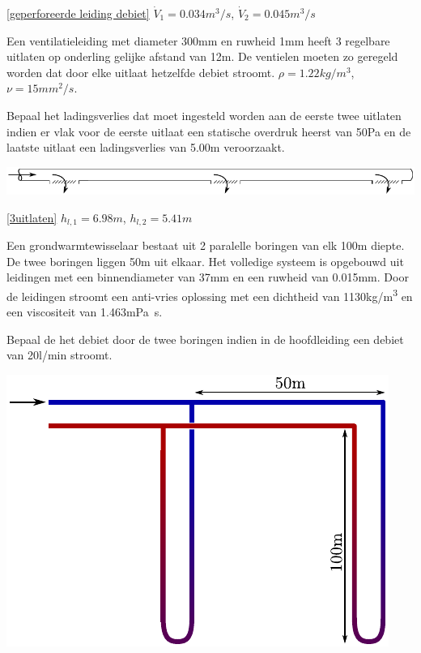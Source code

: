 \begin{antwoord}{\ref{geperforeerde leiding debiet}}
	$\dot{V}_1 = 0.034\unit{m^3/s}$, $\dot{V}_2 = 0.045\unit{m^3/s}$
\end{antwoord}
\begin{toepassing}
	\label{3uitlaten}
Een ventilatieleiding met diameter 300mm en ruwheid 1mm heeft 3 regelbare uitlaten op onderling gelijke afstand van 12m. De ventielen moeten zo geregeld worden dat door elke uitlaat hetzelfde debiet stroomt. $\rho = 1.22\unit{kg/m^3}$, $\nu = 15\unit{mm^2/s}$.
	
Bepaal het ladingsverlies dat moet ingesteld worden aan de eerste twee uitlaten indien er vlak voor de eerste uitlaat een statische overdruk heerst van 50Pa en de laatste uitlaat een ladingsverlies van 5.00m veroorzaakt.

	\centering
	\includegraphics{fig/leidingnetwerken/3uitlaten}
\end{toepassing}
\begin{antwoord}{\ref{3uitlaten}}
	$h_{l,1} = 6.98\unit{m}$, $h_{l,2} = 5.41\unit{m}$
\end{antwoord}
\begin{toepassing}[*]
	\label{grondwarmtewisselaar}
Een grondwarmtewisselaar bestaat uit 2 paralelle boringen van elk 100m diepte. De twee boringen liggen 50m uit elkaar. Het volledige systeem is opgebouwd uit leidingen met een binnendiameter van 37mm en een ruwheid van 0.015mm. Door de leidingen stroomt een anti-vries oplossing met een dichtheid van 1130\unit{kg/m^3} en een viscositeit van 1.463\unit{mPa s}.
	
Bepaal de het debiet door de twee boringen indien in de hoofdleiding een debiet van \unit{20}{l/min} stroomt.

	\centering	
	\includegraphics{fig/leidingnetwerken/grondwarmtewisselaar}
\end{toepassing}
